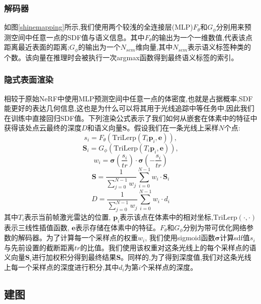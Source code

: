\subsubsection{解码器}
如图\ref{shinemapping}所示,我们使用两个较浅的全连接层(MLP)$F_\theta$和$G_\phi$分别用来预测空间中任意一点的SDF值与语义信息。其中$F_\theta$的输出为一个一维数值,代表该点距离最近表面的距离;$G_\phi$的输出为一个$N_{sem}$维向量,其中$N_{sem}$表示语义标签种类的个数。该向量在推理时会被执行一次argmax函数得到最终语义标签的索引。
\subsubsection{隐式表面渲染}
相较于原始NeRF中使用MLP预测空间中任意一点的体密度,也就是占据概率,SDF能更好的表达几何信息,这也是为什么可以将其用于光线追踪中等任务中,因此我们在训练中直接回归SDF值。下列渲染公式表示了我们如何从嵌套在体素中的特征中获得该处点云最终的深度$D$和语义向量$\mathbf{S}$。假设我们在一条光线上采样$N$个点:
\begin{equation}
    s_i=F_\theta(\mbox{TriLerp}(T_i\mathbf{p}_i,\mathbf{e})),
\end{equation}
\begin{equation}
    \mathbf{S}_i=G_\phi(\mbox{TriLerp}(T_i\mathbf{p}_i,\mathbf{e})),
\end{equation}
\begin{equation}
    w_i=\mathbf{\sigma}(\frac{s_i}{tr})\cdot\mathbf{\sigma}(-\frac{s_i}{tr})
\end{equation}
\begin{equation}
    \mathbf{S} = \frac{1}{\sum_{j=0}^{N-1}w_j}\sum_{i=0}^{N-1}w_i\cdot\mathbf{S}_i
\end{equation}
\begin{equation}
    D = \frac{1}{\sum_{j=0}^{N-1}w_j}\sum_{i=0}^{N-1}w_i\cdot d_i
\end{equation}
其中$T_i$表示当前帧激光雷达的位置, $\mathbf{p}_i$表示该点在体素中的相对坐标,$\mbox{TriLerp}(\cdot , \cdot)$表示三线性插值函数, $\mathbf{e}$表示存储在体素中的特征。$F_\theta\mbox{和}G_\phi$分别为带可优化网络参数的解码器。为了计算每一个采样点的权重$w_i$, 我们使用sigmoid函数$\mathbf{\sigma}$计算sdf值$s_i$与先前设置的截断距离$tr$的比值。我们使用该权重对这条光线上的每个采样点的语义向量$\mathbf{S}_i$进行加权积分得到最终结果$\mathbf{S}$。同样的,为了得到深度值,我们对这条光线上每一个采样点的深度进行积分,其中$d_i$为第$i$个采样点的深度。
\subsection{建图}
